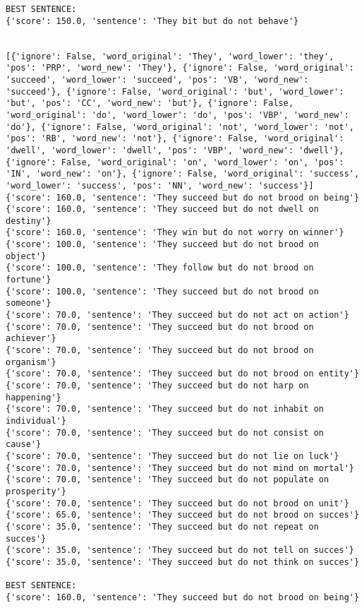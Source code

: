 \documentclass[12pt,a4paper,oneside]{book}
\begin{document}
\begin{verbatim}
BEST SENTENCE:
{'score': 150.0, 'sentence': 'They bit but do not behave'}


[{'ignore': False, 'word_original': 'They', 'word_lower': 'they', 'pos': 'PRP', 'word_new': 'They'}, {'ignore': False, 'word_original': 'succeed', 'word_lower': 'succeed', 'pos': 'VB', 'word_new': 'succeed'}, {'ignore': False, 'word_original': 'but', 'word_lower': 'but', 'pos': 'CC', 'word_new': 'but'}, {'ignore': False, 'word_original': 'do', 'word_lower': 'do', 'pos': 'VBP', 'word_new': 'do'}, {'ignore': False, 'word_original': 'not', 'word_lower': 'not', 'pos': 'RB', 'word_new': 'not'}, {'ignore': False, 'word_original': 'dwell', 'word_lower': 'dwell', 'pos': 'VBP', 'word_new': 'dwell'}, {'ignore': False, 'word_original': 'on', 'word_lower': 'on', 'pos': 'IN', 'word_new': 'on'}, {'ignore': False, 'word_original': 'success', 'word_lower': 'success', 'pos': 'NN', 'word_new': 'success'}]
{'score': 160.0, 'sentence': 'They succeed but do not brood on being'}
{'score': 160.0, 'sentence': 'They succeed but do not dwell on destiny'}
{'score': 160.0, 'sentence': 'They win but do not worry on winner'}
{'score': 100.0, 'sentence': 'They succeed but do not brood on object'}
{'score': 100.0, 'sentence': 'They follow but do not brood on fortune'}
{'score': 100.0, 'sentence': 'They succeed but do not brood on someone'}
{'score': 70.0, 'sentence': 'They succeed but do not act on action'}
{'score': 70.0, 'sentence': 'They succeed but do not brood on achiever'}
{'score': 70.0, 'sentence': 'They succeed but do not brood on organism'}
{'score': 70.0, 'sentence': 'They succeed but do not brood on entity'}
{'score': 70.0, 'sentence': 'They succeed but do not harp on happening'}
{'score': 70.0, 'sentence': 'They succeed but do not inhabit on individual'}
{'score': 70.0, 'sentence': 'They succeed but do not consist on cause'}
{'score': 70.0, 'sentence': 'They succeed but do not lie on luck'}
{'score': 70.0, 'sentence': 'They succeed but do not mind on mortal'}
{'score': 70.0, 'sentence': 'They succeed but do not populate on prosperity'}
{'score': 70.0, 'sentence': 'They succeed but do not brood on unit'}
{'score': 65.0, 'sentence': 'They succeed but do not brood on succes'}
{'score': 35.0, 'sentence': 'They succeed but do not repeat on succes'}
{'score': 35.0, 'sentence': 'They succeed but do not tell on succes'}
{'score': 35.0, 'sentence': 'They succeed but do not think on succes'}

BEST SENTENCE:
{'score': 160.0, 'sentence': 'They succeed but do not brood on being'}



\end{verbatim}
\end{document}
